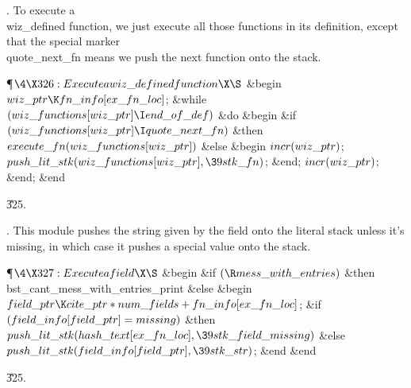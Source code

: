 .
To execute a \\{wiz\_defined} function, we just execute all those
functions in its definition, except that the special marker
\\{quote\_next\_fn} means we push the next function onto the stack.

\Y\P$\4\X326:Execute a \\{wiz\_defined} function\X\S$\6
\&{begin} $\\{wiz\_ptr}\K\\{fn\_info}[\\{ex\_fn\_loc}]$;\6
\&{while} $(\\{wiz\_functions}[\\{wiz\_ptr}]\I\\{end\_of\_def})$ \1\&{do}\6
\&{begin} \&{if} $(\\{wiz\_functions}[\\{wiz\_ptr}]\I\\{quote\_next\_fn})$ %
\1\&{then}\5
$\\{execute\_fn}(\\{wiz\_functions}[\\{wiz\_ptr}])$\6
\4\&{else} \&{begin} $\\{incr}(\\{wiz\_ptr})$;\5
$\\{push\_lit\_stk}(\\{wiz\_functions}[\\{wiz\_ptr}],\39\\{stk\_fn})$;\6
\&{end};\2\6
$\\{incr}(\\{wiz\_ptr})$;\6
\&{end};\2\6
\&{end}\par
\U325.\fi

.
This module pushes the string given by the field onto the literal
stack unless it's \\{missing}, in which case it pushes a special value
onto the stack.

\Y\P$\4\X327:Execute a field\X\S$\6
\&{begin} \&{if} $(\R\\{mess\_with\_entries})$ \1\&{then}\5
\\{bst\_cant\_mess\_with\_entries\_print}\6
\4\&{else} \&{begin} $\\{field\_ptr}\K\\{cite\_ptr}\ast\\{num\_fields}+\\{fn%
\_info}[\\{ex\_fn\_loc}]$;\6
\&{if} $(\\{field\_info}[\\{field\_ptr}]=\\{missing})$ \1\&{then}\5
$\\{push\_lit\_stk}(\\{hash\_text}[\\{ex\_fn\_loc}],\39\\{stk\_field%
\_missing})$\6
\4\&{else} $\\{push\_lit\_stk}(\\{field\_info}[\\{field\_ptr}],\39\\{stk%
\_str})$;\2\6
\&{end}\2\6
\&{end}\par
\U325.\fi

